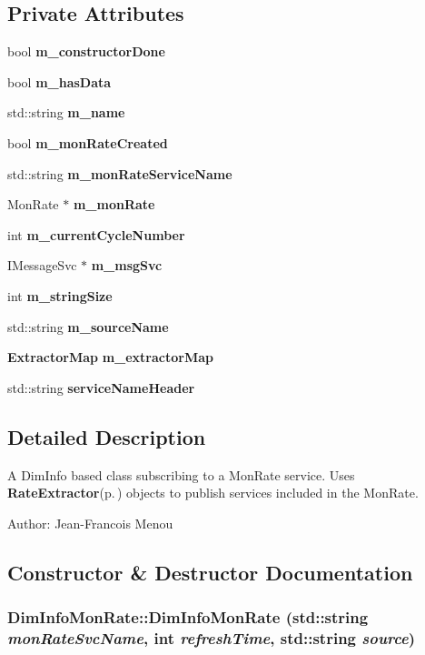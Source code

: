 \subsection*{Private Attributes}
\begin{CompactItemize}
\item 
bool {\bf m\_\-constructor\-Done}
\item 
bool {\bf m\_\-has\-Data}
\item 
std::string {\bf m\_\-name}
\item 
bool {\bf m\_\-mon\-Rate\-Created}
\item 
std::string {\bf m\_\-mon\-Rate\-Service\-Name}
\item 
Mon\-Rate $\ast$ {\bf m\_\-mon\-Rate}
\item 
int {\bf m\_\-current\-Cycle\-Number}
\item 
IMessage\-Svc $\ast$ {\bf m\_\-msg\-Svc}
\item 
int {\bf m\_\-string\-Size}
\item 
std::string {\bf m\_\-source\-Name}
\item 
{\bf Extractor\-Map} {\bf m\_\-extractor\-Map}
\item 
std::string {\bf service\-Name\-Header}
\end{CompactItemize}


\subsection{Detailed Description}
A Dim\-Info based class subscribing to a Mon\-Rate service. Uses {\bf Rate\-Extractor}{\rm (p.\,\pageref{classRateExtractor})} objects to publish services included in the Mon\-Rate.

\begin{Desc}
\item[Author:]Jean-Francois Menou \end{Desc}




\subsection{Constructor \& Destructor Documentation}
\subsubsection{\setlength{\rightskip}{0pt plus 5cm}Dim\-Info\-Mon\-Rate::Dim\-Info\-Mon\-Rate (std::string {\em mon\-Rate\-Svc\-Name}, int {\em refresh\-Time}, std::string {\em source})}\label{classDimInfoMonRate_a0}


